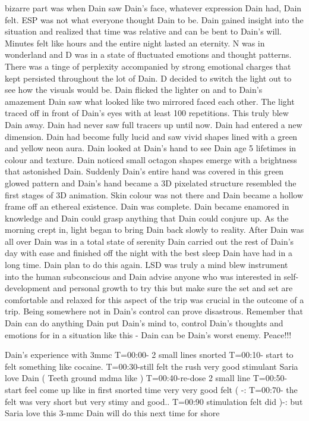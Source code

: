 \documentclass[12pt]{book}
\begin{document}
bizarre part was when Dain saw Dain's face, whatever expression Dain had, Dain felt. ESP was not what everyone thought Dain to be. Dain gained insight into the situation and realized that time was relative and can be bent to Dain's will. Minutes felt like hours and the entire night lasted an eternity. N was in wonderland and D was in a state of fluctuated emotions and thought patterns. There was a tinge of perplexity accompanied by strong emotional charges that kept persisted throughout the lot of Dain. D decided to switch the light out to see how the visuals would be. Dain flicked the lighter on and to Dain's amazement Dain saw what looked like two mirrored faced each other. The light traced off in front of Dain's eyes with at least 100 repetitions. This truly blew Dain away. Dain had never saw full tracers up until now. Dain had entered a new dimension. Dain had become fully lucid and saw vivid shapes lined with a green and yellow neon aura. Dain looked at Dain's hand to see Dain age 5 lifetimes in colour and texture. Dain noticed small octagon shapes emerge with a brightness that astonished Dain. Suddenly Dain's entire hand was covered in this green glowed pattern and Dain's hand became a 3D pixelated structure resembled the first stages of 3D animation. Skin colour was not there and Dain became a hollow frame off an ethereal existence. Dain was complete. Dain became enamored in knowledge and Dain could grasp anything that Dain could conjure up. As the morning crept in, light began to bring Dain back slowly to reality. After Dain was all over Dain was in a total state of serenity Dain carried out the rest of Dain's day with ease and finished off the night with the best sleep Dain have had in a long time. Dain plan to do this again. LSD was truly a mind blew instrument into the human subconscious and Dain advise anyone who was interested in self-development and personal growth to try this but make sure the set and set are comfortable and relaxed for this aspect of the trip was crucial in the outcome of a trip. Being somewhere not in Dain's control can prove disastrous. Remember that Dain can do anything Dain put Dain's mind to, control Dain's thoughts and emotions for in a situation like this - Dain can be Dain's worst enemy. Peace!!!



Dain's experience with 3mmc T=00:00- 2 small lines snorted T=00:10- start to felt something like cocaine. T=00:30-still felt the rush very good stimulant Saria love Dain ( Teeth ground mdma like ) T=00:40-re-dose 2 small line T=00:50-start feel come up like in first snorted time very very good felt ( -: T=00:70- the felt was very short but very stimy and good.. T=00:90 stimulation felt did )-: but Saria love this 3-mmc Dain will do this next time for shore
\end{document}
